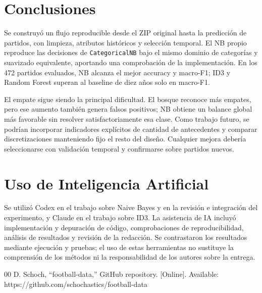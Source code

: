 \documentclass[conference]{IEEEtran}
\begin{document}
\balance
\section{Conclusiones}
Se construyó un flujo reproducible desde el ZIP original hasta la predicción de partidos, con limpieza, atributos históricos y selección temporal. El NB propio reproduce las decisiones de \texttt{CategoricalNB} bajo el mismo dominio de categorías y suavizado equivalente, aportando una comprobación de la implementación. En los 472 partidos evaluados, NB alcanza el mejor accuracy y macro-F1; ID3 y Random Forest superan al baseline de diez años solo en macro-F1.

El empate sigue siendo la principal dificultad. El bosque reconoce más empates, pero ese aumento también genera falsos positivos; NB obtiene un balance global más favorable sin resolver satisfactoriamente esa clase. Como trabajo futuro, se podrían incorporar indicadores explícitos de cantidad de antecedentes y comparar discretizaciones manteniendo fijo el resto del diseño. Cualquier mejora debería seleccionarse con validación temporal y confirmarse sobre partidos nuevos.

\section*{Uso de Inteligencia Artificial}
Se utilizó Codex en el trabajo sobre Naive Bayes y en la revisión e integración del experimento, y Claude en el trabajo sobre ID3. La asistencia de IA incluyó implementación y depuración de código, comprobaciones de reproducibilidad, análisis de resultados y revisión de la redacción. Se contrastaron los resultados mediante ejecución y pruebas; el uso de estas herramientas no sustituye la comprensión de los métodos ni la responsabilidad de los autores sobre la entrega.

\begin{thebibliography}{00}
 D. Schoch, ``football-data,'' GitHub repository. [Online]. Available: https://github.com/schochastics/football-data
\end{thebibliography}
\end{document}

